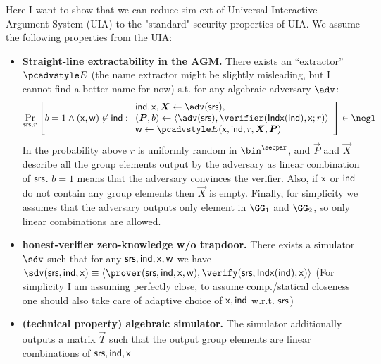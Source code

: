 \documentclass[runningheads,11pt]{llncs}
\begin{document}
Here I want to show that we can reduce sim-ext of Universal Interactive Argument System
(UIA) to the "standard" security properties of UIA.
We assume the following properties from the UIA:
\begin{itemize}
	\item {\bf Straight-line extractability in the AGM.}
		There exists an ``extractor'' $\Ext$ (the name extractor might be slightly misleading, but I
		cannot find a better name for now) s.t. for any algebraic adversary $\adv$:
		\[
			\Prob[\srs,r]{
					b=1 \wedge (\inp,\wit)\not\in\ind:
					\begin{array}{l}
					\ind,\inp, \vec X \gets\adv(\srs),\\
					(\vec P,b) \gets \braket{\adv(\srs),\verifier(\Iphp(\ind),\inp;r)}\\
					\wit \gets \Ext(\inp,\ind,r,\vec X,\vec P)
					\end{array}
					}\in\negl
		\]
		In the probability above $r$ is uniformly random in $\bin^\secpar$, and $\vec P$ and
		$\vec X$	describe all the group elements output by the adversary as linear combination of
		$\mathsf{srs}$. $b=1$ means that the adversary convinces the verifier. Also, if $\mathsf{x}$ or ${\mathsf{ind}}$
		do not contain any group elements then $\vec X$ is	empty. Finally, for simplicity we assumes that the adversary outputs only element in
		$\GG_1$ and $\GG_2$, so only linear combinations are allowed.
	\item {\bf honest-verifier zero-knowledge w/o trapdoor.}
		There exists a simulator $\sdv$ such that for any $\mathsf{srs},{\mathsf{ind}},\mathsf{x},\mathsf{w}$ we have
		$\sdv(\srs,\ind,\inp)\equiv
		\braket{\prover(\srs,\ind,\inp,\wit),\verify(\srs,\Iphp(\ind),\inp)}$
		(For simplicity I am assuming perfectly close, to assume comp./statical closeness one should also
		take care of adaptive choice of $\mathsf{x},{\mathsf{ind}}$ w.r.t. $\mathsf{srs}$)

	\item {\bf (technical property) algebraic simulator.}
		The simulator additionally outputs a matrix $\vec T$ such that the output group elements
		are linear combinations of $\mathsf{srs},{\mathsf{ind}},\mathsf{x}$

\end{itemize}
\end{document}

